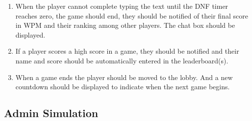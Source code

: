 \documentclass[titlepage]{article}
\begin{document}
\begin{enumerate}
	\item  When the player cannot complete typing the text until the DNF timer reaches zero, the game should end, they should be notified of their final score in WPM and their ranking among other players. The chat box should be displayed.
	\item If a player scores a high score in a game, they should be notified and their name and score should be automatically entered in the leaderboard(s).
	\item When a game ends the player should be moved to the lobby. And a new countdown should be displayed to indicate when the next game begins.
\end{enumerate}

\subsection{Admin Simulation}
\end{document}
